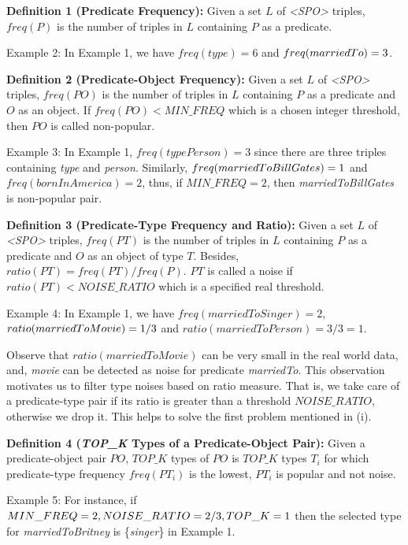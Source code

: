 \documentclass{acm_proc_article-sp}
\begin{document}
\textbf{Definition 1 (Predicate Frequency):} Given a set $L$ of \textit{<SPO>} triples, $freq(P)$ is the number of triples in $L$ containing $P$ as a predicate.

Example 2: In Example 1, we have $freq(type) = 6$ and $freq(marriedTo)\\ = 3$.

\textbf{Definition 2 (Predicate-Object Frequency):} Given a set $L$ of \textit{<SPO>} triples, $freq(PO)$ is the number of triples in $L$ containing $P$ as a predicate and $O$ as an object. If $freq(PO) < MIN\_FREQ$ which is a chosen integer threshold, then $PO$ is called non-popular.

Example 3: In Example 1, $freq(typePerson) = 3$ since there are three triples containing \textit{type} and \textit{person}. Similarly, $freq(married\\ToBillGates) = 1$ and $freq(bornInAmerica) = 2$, thus, if $MIN\_FREQ = 2$, then \textit{marriedToBillGates} is non-popular pair.

\textbf{Definition 3 (Predicate-Type Frequency and Ratio):} Given a set $L$ of \textit{<SPO>} triples, $freq(PT)$ is the number of triples in $L$ containing $P$ as a predicate and $O$ as an object of type $T$. Besides, $ratio(PT) = freq(PT) / freq(P)$. $PT$ is called a noise if $ratio(PT) < NOISE\_RATIO$ which is a specified real threshold.

Example 4: In Example 1, we have $freq(marriedToSinger) = 2$, $ratio\\(marriedToMovie) = 1 / 3$ and $ratio(marriedToPerson) = 3 / 3 = 1$.

Observe that $ratio(marriedToMovie)$ can be very small in the real world data, and, \textit{movie} can be detected as noise for predicate \textit{marriedTo}. This observation motivates us to filter type noises based on ratio measure. That is, we take care of a predicate-type pair if its ratio is greater than a threshold $NOISE\_RATIO$, otherwise we drop it. This helps to solve the first problem mentioned in (i).

\textbf{Definition 4 (\textit{TOP\_K} Types of a Predicate-Object Pair):} Given a predicate-object pair $PO$, $TOP\_K$ types of $PO$ is $TOP\_K$ types $T_{i}$ for which predicate-type frequency $freq(PT_{i})$ is the lowest, $PT_{i}$ is popular and not noise.

Example 5: For instance, if $MIN\_FREQ = 2, NOISE\_\\RATIO = 2 / 3, TOP\_K = 1$ then the selected type for \textit{marriedToBritney} is \{\textit{singer}\} in Example 1.
\end{document}
